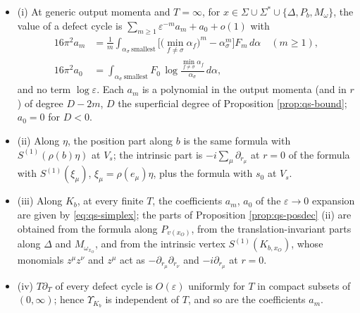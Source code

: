 \begin{theorem}
\label{thm:qs-simplex}
\begin{itemize}
\item (i) At generic output momenta and $T=\infty$, for $x\in\Sigma\cup\Sigma^*\cup\{\Delta,P_b,M_\omega\}$, the value of a defect cycle is $\sum_{m\ge1}\varepsilon^{-m}a_m+a_0+o(1)$ with
\begin{equation}
\begin{aligned}
16\pi^2a_m&=\frac1m\int_{\alpha_\sigma\ \text{smallest}}\Big[\big(\min_{f\ne\sigma}\alpha_f\big)^m-\alpha_\sigma^m\Big]F_m\,d\alpha\quad(m\ge1),\\
16\pi^2a_0&=\int_{\alpha_\sigma\ \text{smallest}}F_0\,\log\frac{\min_{f\ne\sigma}\alpha_f}{\alpha_\sigma}\,d\alpha ,
\end{aligned}
\label{eq:qs-simplex}
\end{equation}
and no term $\log\varepsilon$. Each $a_m$ is a polynomial in the output momenta (and in $r$) of degree $D-2m$, $D$ the superficial degree of Proposition \ref{prop:qs-bound}; $a_0=0$ for $D<0$.
\item (ii) Along $\eta$, the position part along $b$ is the same formula with $S^{(1)}(\rho(b)\eta)$ at $V_s$; the intrinsic part is $-i\sum_\mu\partial_{r_\mu}$ at $r=0$ of the formula with $S^{(1)}(\xi_\mu)$, $\xi_\mu=\rho(e_\mu)\eta$, plus the formula with $s_0$ at $V_s$.
\item (iii) Along $K_b$, at every finite $T$, the coefficients $a_m$, $a_0$ of the $\varepsilon\to0$ expansion are given by \eqref{eq:qs-simplex}; the parts of Proposition \ref{prop:qs-posdec} (ii) are obtained from the formula along $P_{v(x_O)}$, from the translation-invariant parts along $\Delta$ and $M_{\omega_{x_O}}$, and from the intrinsic vertex $S^{(1)}(K_{b,x_O})$, whose monomials $z^\mu z^\nu$ and $z^\mu$ act as $-\partial_{r_\mu}\partial_{r_\nu}$ and $-i\partial_{r_\mu}$ at $r=0$.
\item (iv) $T\partial_T$ of every defect cycle is $O(\varepsilon)$ uniformly for $T$ in compact subsets of $(0,\infty)$; hence $\Upsilon_{K_b}$ is independent of $T$, and so are the coefficients $a_m$.
\end{itemize}
\end{theorem}

